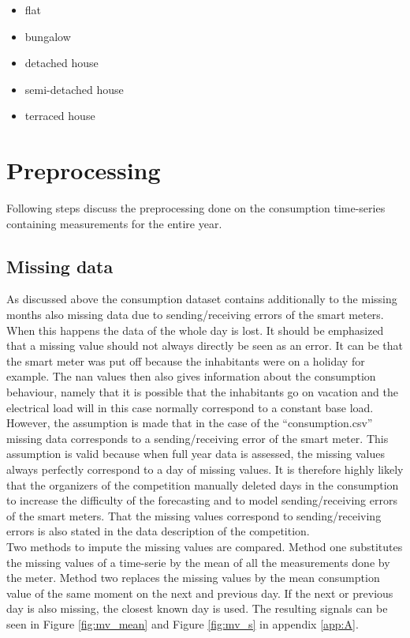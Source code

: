 \begin{itemize}
	\item flat
	\item bungalow
	\item detached house
	\item semi-detached house
	\item terraced house
\end{itemize}


\section{Preprocessing}

Following steps discuss the preprocessing done on the consumption time-series containing measurements for the entire year. 

\subsection{Missing data} \label{s:missing_data}
As discussed above the consumption dataset contains additionally to the missing months also missing data due to sending/receiving errors of the smart meters. When this happens the data of the whole day is lost. It should be emphasized that a missing value should not always directly be seen as an error. It can be that the smart meter was put off because the inhabitants were on a holiday for example. The nan values then also gives information about the consumption behaviour, namely that it is possible that the inhabitants go on vacation and the electrical load will in this case normally correspond to a constant base load. However, the assumption is made that in the case of the ``consumption.csv'' missing data corresponds to a sending/receiving error of the smart meter. This assumption is valid because when full year data is assessed, the missing values always perfectly correspond to a day of missing values. It is therefore highly likely that the organizers of the competition manually deleted days in the consumption to increase the difficulty of the forecasting and to model sending/receiving errors of the smart meters. That the missing values correspond to sending/receiving errors is also stated in the data description of the competition.\\

 Two methods to impute the missing values are compared. Method one substitutes the missing values of a time-serie by the mean of all the measurements done by the meter. Method two replaces the missing values by the mean consumption value of the same moment on the next and previous day. If the next or previous day is also missing, the closest known day is used. The resulting signals can be seen in Figure \ref{fig:mv_mean} and Figure \ref{fig:mv_s} in appendix \ref{app:A}.\\
 

